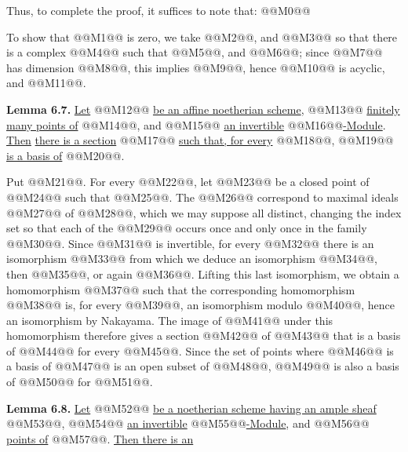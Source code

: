 Thus, to complete the proof, it suffices to note that:
@@M0@@

To show that @@M1@@ is zero, we take @@M2@@, and @@M3@@ so that there is a complex @@M4@@ such that @@M5@@, and @@M6@@; since @@M7@@ has dimension @@M8@@, this implies @@M9@@, hence @@M10@@ is acyclic, and @@M11@@.

\textbf{Lemma 6.7.} \uline{Let} @@M12@@ \uline{be an affine noetherian scheme}, @@M13@@ \uline{finitely many points of} @@M14@@, and @@M15@@ \uline{an invertible} @@M16@@\uline{-Module}. \uline{Then} \uline{there is a section} @@M17@@ \uline{such that, for every} @@M18@@, @@M19@@ \uline{is a basis of} @@M20@@.

Put @@M21@@. For every @@M22@@, let @@M23@@ be a closed point of @@M24@@ such that @@M25@@. The @@M26@@ correspond to maximal ideals @@M27@@ of @@M28@@, which we may suppose all distinct, changing the index set so that each of the @@M29@@ occurs once and only once in the family @@M30@@. Since @@M31@@ is invertible, for every @@M32@@ there is an isomorphism @@M33@@ from which we deduce an isomorphism @@M34@@, then @@M35@@, or again @@M36@@. Lifting this last isomorphism, we obtain a homomorphism @@M37@@ such that the corresponding homomorphism @@M38@@ is, for every @@M39@@, an isomorphism modulo @@M40@@, hence an isomorphism by Nakayama. The image of @@M41@@ under this homomorphism therefore gives a section @@M42@@ of @@M43@@ that is a basis of @@M44@@ for every @@M45@@. Since the set of points where @@M46@@ is a basis of @@M47@@ is an open subset of @@M48@@, @@M49@@ is also a basis of @@M50@@ for @@M51@@.

\textbf{Lemma 6.8.} \uline{Let} @@M52@@ \uline{be a noetherian scheme having an ample sheaf} @@M53@@, @@M54@@ \uline{an invertible} @@M55@@\uline{-Module}, and @@M56@@ \uline{points of} @@M57@@. \uline{Then there is an}
